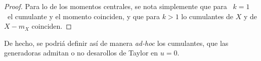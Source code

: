 {\begin{proof}
  Para lo de los momentos centrales, se nota simplemente que para \ $k = 1$ \ el
  cumulante y el momento coinciden, y que para $k > 1$ lo cumulantes de $X$ y de
  $X-m_X$ coinciden.
\end{proof}
%

De hecho, se  podri\'a definir as\'i de manera {\em  ad-hoc} los cumulantes, que
las generadoras admitan o no desarollos de Taylor en $u = 0$.

\

}
